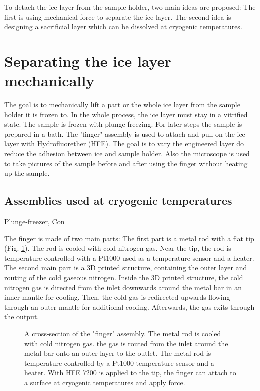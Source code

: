 
To detach the ice layer from the sample holder, two main ideas are proposed: The first is using mechanical force to separate the ice layer. The second idea is designing a sacrificial layer which can be dissolved at cryogenic temperatures.

\section{Separating the ice layer mechanically}

The goal is to mechanically lift a part or the whole ice layer from the sample holder it is frozen to. In the whole process, the ice layer must stay in a vitrified state. The sample is frozen with plunge-freezing. For later steps the sample is prepared in a bath. The "finger" assembly is used to attach and pull on the ice layer with Hydrofluorether (HFE). The goal is to vary the engineered layer do reduce the adhesion between ice and sample holder. Also the microscope is used to take pictures  of the sample before and after using the finger without heating up the sample. 

\subsection{Assemblies used at cryogenic temperatures}

Plunge-freezer, Con

The finger is made of two main parts: The first part is a metal rod with a flat tip (Fig. \ref{fig:querschnittfinger}). The rod is cooled with cold nitrogen gas. Near the tip, the rod is temperature controlled with a Pt1000 used as a temperature sensor and a heater. The second main part is a 3D printed structure, containing the outer layer and routing of the cold gaseous nitrogen. Inside the 3D printed structure, the cold nitrogen gas is directed from the inlet downwards around the metal bar in an inner mantle for cooling. Then, the cold gas is redirected upwards flowing through an outer mantle for additional cooling. Afterwards, the gas exits through the output.

\begin{figure}[hbt!]
	\centering
	
	\caption{A cross-section of the "finger" assembly. The metal rod is cooled with cold nitrogen gas. the gas is routed from the inlet around the metal bar onto an outer layer to the outlet. The metal rod is temperature controlled by a Pt1000 temperature sensor and a heater. With HFE 7200 is applied to the tip, the finger can attach to a surface at cryogenic temperatures and apply force. }
	\label{fig:querschnittfinger}
\end{figure}

